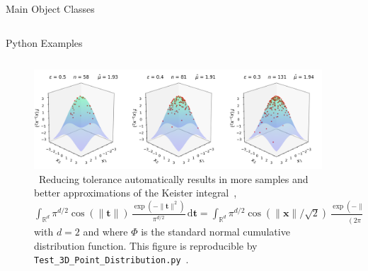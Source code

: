 \documentclass[final]{beamer}
\newlength{\onecolwid}
\newlength{\twocolwid}
\newlength{\threecolwid}
\newcommand{\dif}{\mathrm{d}}
\newcommand{\bvec}[1]{\boldsymbol{#1}}
\newcommand{\vx}{\bvec{x}}
\newcommand{\vt}{\bvec{t}}
\begin{document}
\begin{frame}[t]
\begin{columns}[t]
\begin{column}{\threecolwid}
\begin{columns}[t,totalwidth=\threecolwid]
\begin{column}{\twocolwid}
\begin{block}{Main Object Classes}
\end{block}
\end{column}

\end{columns} 

\begin{column}{\threecolwid}\vspace{-0.8in}
\begin{block}{Python Examples}
    \begin{column}{\onecolwid}
	\vspace{.5in}
        
    \end{column}
	\begin{column}{\twocolwid}
        \begin{figure} 
            \includegraphics[width=0.96\textwidth]{Images/Three_3d_SurfaceScatters.png}         
            \caption{\ Reducing tolerance automatically results in more samples and better approximations of the Keister integral~\cite{keister1996multidimensional},  
$\displaystyle \int_{\mathbb{R}^d} \pi^{d/2} \cos(\lVert \vt \rVert) \, \frac{\exp(-\lVert \vt \rVert^2)}{\pi^{d/2}}\,\dif \vt = 
 \int_{\mathbb{R}^d} \pi^{d/2} \cos(\lVert \vx \rVert /\sqrt{2}) \, \frac{\exp(-\lVert \vx \rVert^2/2)}{(2\pi)^{d/2}}\,\dif \vx
\approx 1.80819 $  with $d=2$ and where $\Phi$ is the  standard normal  cumulative distribution function. This figure is reproducible by \texttt{Test\_3D\_Point\_Distribution.py}~\cite{HicEtal19}.}  \label{fig3d}
        \end{figure} 
    \end{column}


\end{block}
\end{column}
\end{column}
\end{columns}
\end{frame}
\end{document}
